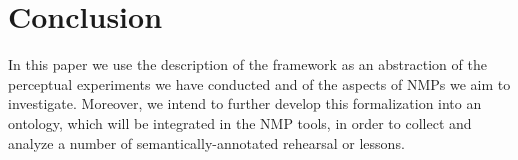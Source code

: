 
\section{Conclusion}\label{sec:conclusion}

In this paper we use the description of the framework as an abstraction of the perceptual experiments we have conducted and of the aspects of NMPs we aim to investigate. Moreover, we intend to further develop this formalization into an ontology, which will be integrated in the NMP tools, in order to collect and analyze a number of semantically-annotated rehearsal or lessons. 
